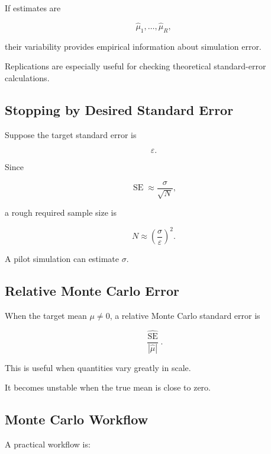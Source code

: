 If estimates are

\[
\widehat{\mu}_1,
\ldots,
\widehat{\mu}_R,
\]

their variability provides empirical information about simulation error.

Replications are especially useful for checking theoretical standard-error
calculations.

\subsection{Stopping by Desired Standard Error}
\label{subsec:mc-stopping-standard-error}

Suppose the target standard error is

\[
\varepsilon.
\]

Since

\[
\operatorname{SE}
\approx
\frac{\sigma}{\sqrt{N}},
\]

a rough required sample size is

\[
\boxed{
N
\approx
\left(
\frac{
\sigma
}{
\varepsilon
}
\right)^2.
}
\]

A pilot simulation can estimate \(\sigma\).

\subsection{Relative Monte Carlo Error}
\label{subsec:relative-mc-error}

When the target mean \(\mu\neq0\), a relative Monte Carlo standard error is

\[
\boxed{
\frac{
\widehat{\operatorname{SE}}
}{
|\widehat{\mu}|
}.
}
\]

This is useful when quantities vary greatly in scale.

It becomes unstable when the true mean is close to zero.

\subsection{Monte Carlo Workflow}
\label{subsec:monte-carlo-workflow}

A practical workflow is:

